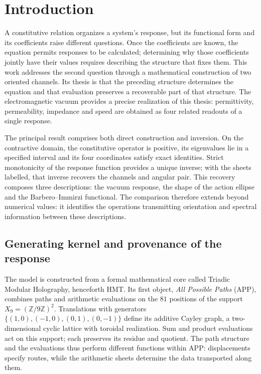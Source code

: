 \clearpage
\section{Introduction}
\label{iii:sec:introduccion}

A constitutive relation organizes a system's response, but its
functional form and its coefficients raise different questions. Once
the coefficients are known, the equation permits responses to be
calculated; determining why those coefficients jointly have their
values requires describing the structure that fixes them. This work
addresses the second question through a mathematical construction of
two oriented channels. Its thesis is that the preceding structure
determines the equation and that evaluation preserves a recoverable
part of that structure. The electromagnetic vacuum provides a precise
realization of this thesis: permittivity, permeability, impedance and
speed are obtained as four related readouts of a single response.

The principal result comprises both direct construction and inversion.
On the contractive domain, the constitutive operator is positive,
its eigenvalues lie in a specified interval and its four coordinates
satisfy exact identities. Strict monotonicity of the response function
provides a unique inverse; with the sheets labelled, that inverse
recovers the channels and angular pair. This recovery composes three
descriptions: the vacuum response, the shape of the action ellipse
and the Barbero--Immirzi functional. The comparison therefore extends
beyond numerical values: it identifies the operations transmitting
orientation and spectral information between these descriptions.

\subsection{Generating kernel and provenance of the response}

The model is constructed from a formal mathematical core called
Triadic Modular Holography, henceforth HMT. Its first object,
\emph{All Possible Paths} (APP), combines paths and arithmetic
evaluations on the $81$ positions of the support
$X_9=(\mathbb Z/9\mathbb Z)^2$. Translations with generators
$\{(1,0),(-1,0),(0,1),(0,-1)\}$ define its additive Cayley graph,
a two-dimensional cyclic lattice with toroidal realization. Sum and
product evaluations act on this support; each preserves its residue
and quotient. The path structure and the evaluations thus perform
different functions within APP: displacements specify routes, while
the arithmetic sheets determine the data transported along them.

